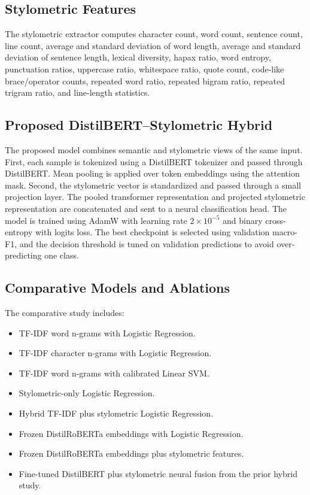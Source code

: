 \documentclass[conference]{IEEEtran}
\begin{document}
\subsection{Stylometric Features}
The stylometric extractor computes character count, word count, sentence count, line count, average and standard deviation of word length, average and standard deviation of sentence length, lexical diversity, hapax ratio, word entropy, punctuation ratios, uppercase ratio, whitespace ratio, quote count, code-like brace/operator counts, repeated word ratio, repeated bigram ratio, repeated trigram ratio, and line-length statistics.

\subsection{Proposed DistilBERT--Stylometric Hybrid}
The proposed model combines semantic and stylometric views of the same input. First, each sample is tokenized using a DistilBERT tokenizer and passed through DistilBERT. Mean pooling is applied over token embeddings using the attention mask. Second, the stylometric vector is standardized and passed through a small projection layer. The pooled transformer representation and projected stylometric representation are concatenated and sent to a neural classification head. The model is trained using AdamW with learning rate $2\times10^{-5}$ and binary cross-entropy with logits loss. The best checkpoint is selected using validation macro-F1, and the decision threshold is tuned on validation predictions to avoid over-predicting one class.

\subsection{Comparative Models and Ablations}
The comparative study includes:
\begin{itemize}
\item TF-IDF word n-grams with Logistic Regression.
\item TF-IDF character n-grams with Logistic Regression.
\item TF-IDF word n-grams with calibrated Linear SVM.
\item Stylometric-only Logistic Regression.
\item Hybrid TF-IDF plus stylometric Logistic Regression.
\item Frozen DistilRoBERTa embeddings with Logistic Regression.
\item Frozen DistilRoBERTa embeddings plus stylometric features.
\item Fine-tuned DistilBERT plus stylometric neural fusion from the prior hybrid study.
\end{itemize}
\end{document}
